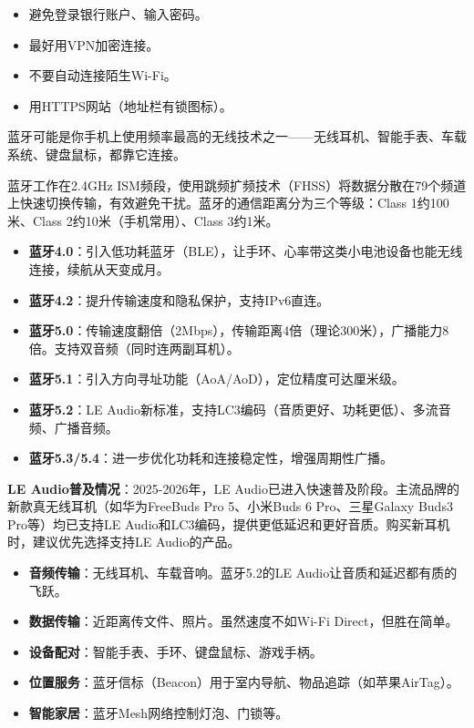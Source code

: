 \begin{itemize}
  \item 避免登录银行账户、输入密码。
  \item 最好用VPN加密连接。
  \item 不要自动连接陌生Wi-Fi。
  \item 用HTTPS网站（地址栏有锁图标）。
\end{itemize}


蓝牙可能是你手机上使用频率最高的无线技术之一——无线耳机、智能手表、车载系统、键盘鼠标，都靠它连接。


蓝牙工作在2.4GHz ISM频段，使用跳频扩频技术（FHSS）将数据分散在79个频道上快速切换传输，有效避免干扰。蓝牙的通信距离分为三个等级：Class 1约100米、Class 2约10米（手机常用）、Class 3约1米。


\begin{itemize}
  \item \textbf{蓝牙4.0}：引入低功耗蓝牙（BLE），让手环、心率带这类小电池设备也能无线连接，续航从天变成月。
  \item \textbf{蓝牙4.2}：提升传输速度和隐私保护，支持IPv6直连。
  \item \textbf{蓝牙5.0}：传输速度翻倍（2Mbps），传输距离4倍（理论300米），广播能力8倍。支持双音频（同时连两副耳机）。
  \item \textbf{蓝牙5.1}：引入方向寻址功能（AoA/AoD），定位精度可达厘米级。
  \item \textbf{蓝牙5.2}：LE Audio新标准，支持LC3编码（音质更好、功耗更低）、多流音频、广播音频。
  \item \textbf{蓝牙5.3/5.4}：进一步优化功耗和连接稳定性，增强周期性广播。
\end{itemize}

\textbf{LE Audio普及情况}：2025-2026年，LE Audio已进入快速普及阶段。主流品牌的新款真无线耳机（如华为FreeBuds Pro 5、小米Buds 6 Pro、三星Galaxy Buds3 Pro等）均已支持LE Audio和LC3编码，提供更低延迟和更好音质。购买新耳机时，建议优先选择支持LE Audio的产品。


\begin{itemize}
  \item \textbf{音频传输}：无线耳机、车载音响。蓝牙5.2的LE Audio让音质和延迟都有质的飞跃。
  \item \textbf{数据传输}：近距离传文件、照片。虽然速度不如Wi-Fi Direct，但胜在简单。
  \item \textbf{设备配对}：智能手表、手环、键盘鼠标、游戏手柄。
  \item \textbf{位置服务}：蓝牙信标（Beacon）用于室内导航、物品追踪（如苹果AirTag）。
  \item \textbf{智能家居}：蓝牙Mesh网络控制灯泡、门锁等。
\end{itemize}

